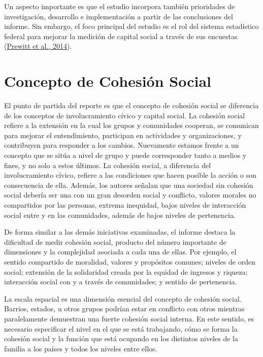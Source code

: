\documentclass[
  12pt,
]{book}
\begin{document}
Un aspecto importante es que el estudio incorpora también prioridades de investigación, desarrollo e implementación a partir de las conclusiones del informe. Sin embargo, el foco principal del estudio es el rol del sistema estadístico federal para mejorar la medición de capital social a través de sus encuestas (\protect\hyperlink{ref-prewitt_Civic_2014}{Prewitt et al., 2014}).

\hypertarget{concepto-de-cohesiuxf3n-social-3}{%
\section{Concepto de Cohesión Social}\label{concepto-de-cohesiuxf3n-social-3}}

El punto de partida del reporte es que el concepto de cohesión social se diferencia de los conceptos de involucramiento cívico y capital social. La cohesión social refiere a la extensión en la cual los grupos y comunidades cooperan, se comunican para mejorar el entendimiento, participan en actividades y organizaciones, y contribuyen para responder a los cambios. Nuevamente estamos frente a un concepto que se sitúa a nivel de grupo y puede corresponder tanto a medios y fines, y no solo a estos últimos. La cohesión social, a diferencia del involucramiento cívico, refiere a las condiciones que hacen posible la acción o son consecuencia de ella. Además, los autores señalan que una sociedad sin cohesión social debería ser una con un gran desorden social y conflicto, valores morales no compartidos por las personas, extrema inequidad, bajos niveles de interacción social entre y en las comunidades, además de bajos niveles de pertenencia.

De forma similar a las demás iniciativas examinadas, el informe destaca la dificultad de medir cohesión social, producto del número importante de dimensiones y la complejidad asociada a cada una de ellas. Por ejemplo, el sentido compartido de moralidad, valores y propósitos comunes; niveles de orden social; extensión de la solidaridad creada por la equidad de ingresos y riqueza; interacción social con y a través de comunidades; y sentido de pertenencia.

La escala espacial es una dimensión esencial del concepto de cohesión social. Barrios, estados, u otros grupos podrían estar en conflicto con otros mientras paralelamente demuestran una fuerte cohesión social interna. En este sentido, es necesario especificar el nivel en el que se está trabajando, cómo se forma la cohesión social y la función que está ocupando en los distintos niveles de la familia a los países y todos los niveles entre ellos.
\end{document}

